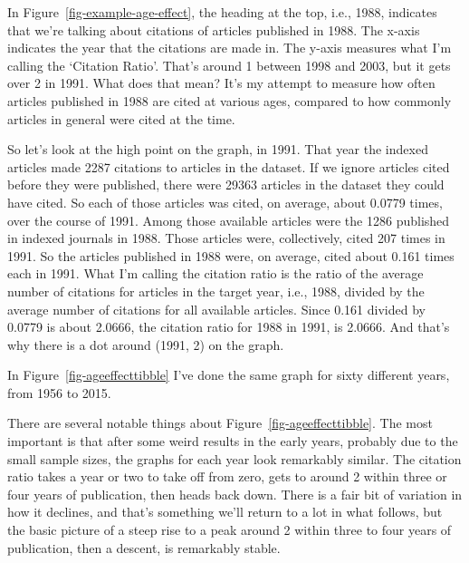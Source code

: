 \documentclass[
  11pt,
  letterpaper,
  DIV=11,
  numbers=noendperiod,
  twoside]{scrartcl}
\makeatletter
\newcommand*\pandocbounded[1]{%
  \sbox\pandoc@box{#1}%
  \Gscale@div\@tempa{\textheight}{\dimexpr\ht\pandoc@box+\dp\pandoc@box\relax}%
  \Gscale@div\@tempb{\linewidth}{\wd\pandoc@box}%
  \ifdim\@tempb\p@<\@tempa\p@\let\@tempa\@tempb\fi%
  \ifdim\@tempa\p@<\p@\scalebox{\@tempa}{\usebox\pandoc@box}%
  \else\usebox{\pandoc@box}%
  \fi%
}
\makeatother
\begin{document}
In Figure~\ref{fig-example-age-effect}, the heading at the top, i.e.,
1988, indicates that we're talking about citations of articles published
in 1988. The x-axis indicates the year that the citations are made in.
The y-axis measures what I'm calling the `Citation Ratio'. That's around
1 between 1998 and 2003, but it gets over 2 in 1991. What does that
mean? It's my attempt to measure how often articles published in 1988
are cited at various ages, compared to how commonly articles in general
were cited at the time.

So let's look at the high point on the graph, in 1991. That year the
indexed articles made 2287 citations to articles in the dataset. If we
ignore articles cited before they were published, there were 29363
articles in the dataset they could have cited. So each of those articles
was cited, on average, about 0.0779 times, over the course of 1991.
Among those available articles were the 1286 published in indexed
journals in 1988. Those articles were, collectively, cited 207 times in
1991. So the articles published in 1988 were, on average, cited about
0.161 times each in 1991. What I'm calling the citation ratio is the
ratio of the average number of citations for articles in the target
year, i.e., 1988, divided by the average number of citations for all
available articles. Since 0.161 divided by 0.0779 is about 2.0666, the
citation ratio for 1988 in 1991, is 2.0666. And that's why there is a
dot around (1991, 2) on the graph.

In Figure~\ref{fig-ageeffecttibble} I've done the same graph for sixty
different years, from 1956 to 2015.

\begin{figure*}

\centering{

\pandocbounded{\texttt{[image: apc\_files/figure-pdf/fig-ageeffecttibble-1.pdf]}}

}

\caption{\label{fig-ageeffecttibble}Each facet shows the relative
citation rate for articles published that year at different ages.}

\end{figure*}%

There are several notable things about Figure~\ref{fig-ageeffecttibble}.
The most important is that after some weird results in the early years,
probably due to the small sample sizes, the graphs for each year look
remarkably similar. The citation ratio takes a year or two to take off
from zero, gets to around 2 within three or four years of publication,
then heads back down. There is a fair bit of variation in how it
declines, and that's something we'll return to a lot in what follows,
but the basic picture of a steep rise to a peak around 2 within three to
four years of publication, then a descent, is remarkably stable.
\end{document}
